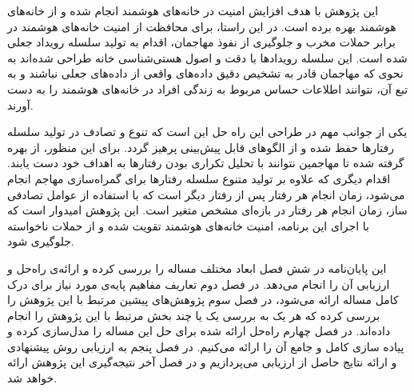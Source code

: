 این پژوهش با هدف افزایش امنیت در خانه‌های هوشمند انجام شده و از  خانه‌های هوشمند بهره برده است. در این راستا، برای محافظت از امنیت خانه‌های هوشمند در برابر حملات مخرب و جلوگیری از نفوذ مهاجمان، اقدام به تولید سلسله رویداد جعلی شده است. این سلسله رویدادها با دقت و اصول هستی‌شناسی خانه طراحی شده‌اند به نحوی که مهاجمان قادر به تشخیص دقیق داده‌های واقعی از داده‌های جعلی نباشند و به تبع آن، نتوانند اطلاعات حساس مربوط به زندگی افراد در خانه‌های هوشمند را به دست آورند.

یکی از جوانب مهم در طراحی این راه حل این است که تنوع و تصادف در تولید سلسله رفتارها حفظ شده و از الگوهای قابل پیش‌بینی پرهیز گردد. برای این منظور، از  بهره گرفته شده تا مهاجمین نتوانند با تحلیل تکراری بودن رفتارها به اهداف خود دست یابند. اقدام دیگری که علاوه بر تولید متنوع سلسله رفتارها برای گمراه‌سازی مهاجم انجام می‌شود، زمان انجام هر رفتار پس از رفتار دیگر است که با استفاده از عوامل تصادفی ساز، زمان انجام هر رفتار در بازه‌ای مشخص متغیر است. این پژوهش امیدوار است که با اجرای این برنامه، امنیت خانه‌های هوشمند تقویت شده و از حملات ناخواسته جلوگیری شود.

این پایان‌نامه در شش فصل ابعاد مختلف مساله را بررسی کرده و ارائه‌ی راه‌حل و ارزیابی آن را انجام می‌دهد. در فصل دوم تعاریف مفاهیم پایه‌ی مورد نیاز برای درک کامل مساله ارائه می‌شود، در فصل سوم پژوهش‌های پیشین مرتبط با این پژوهش را بررسی کرده که هر یک به بررسی یک یا چند بخش مرتبط با این پژوهش را انجام داده‌اند. در فصل چهارم راه‌حل ارائه شده برای حل این مساله را مدل‌سازی کرده و پیاده سازی کامل و جامع آن را ارائه می‌کنیم. در فصل پنجم به ارزیابی روش پیشنهادی و ارائه نتایج حاصل از ارزیابی می‌پردازیم و در فصل آخر نتیجه‌گیری این پژوهش ارائه خواهد شد.

